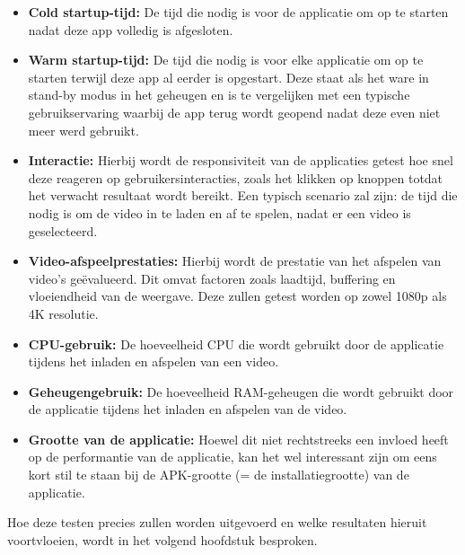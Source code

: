 \begin{itemize}
    \item \textbf{Cold startup-tijd:} De tijd die nodig is voor de applicatie om op te starten nadat deze app volledig is afgesloten.
    \item \textbf{Warm startup-tijd:} De tijd die nodig is voor elke applicatie om op te starten terwijl deze app al eerder is opgestart. Deze staat als het ware in stand-by modus in het geheugen en is te vergelijken met een typische gebruikservaring waarbij de app terug wordt geopend nadat deze even niet meer werd gebruikt.
    \item \textbf{Interactie:} Hierbij wordt de responsiviteit van de applicaties getest hoe snel deze reageren op gebruikersinteracties, zoals het klikken op knoppen totdat het verwacht resultaat wordt bereikt. Een typisch scenario zal zijn: de tijd die nodig is om de video in te laden en af te spelen, nadat er een video is geselecteerd.
    \item \textbf{Video-afspeelprestaties:} Hierbij wordt de prestatie van het afspelen van video's geëvalueerd. Dit omvat factoren zoals laadtijd, buffering en vloeiendheid van de weergave. Deze zullen getest worden op zowel 1080p als 4K resolutie.
    \item \textbf{CPU-gebruik:} De hoeveelheid CPU die wordt gebruikt door de applicatie tijdens het inladen en afspelen van een video.
    \item \textbf{Geheugengebruik:} De hoeveelheid RAM-geheugen die wordt gebruikt door de applicatie tijdens het inladen en afspelen van de video.
    \item \textbf{Grootte van de applicatie:} Hoewel dit niet rechtstreeks een invloed heeft op de performantie van de applicatie, kan het wel interessant zijn om eens kort stil te staan bij de APK-grootte (= de installatiegrootte) van de applicatie.
\end{itemize}

Hoe deze testen precies zullen worden uitgevoerd en welke resultaten hieruit voortvloeien, wordt in het volgend hoofdstuk besproken.